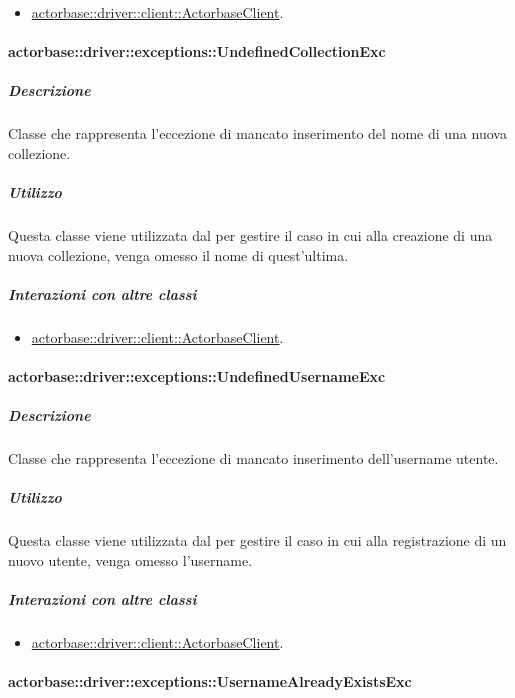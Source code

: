 \documentclass{scalatekids-article}
\begin{document}
\begin{itemize}
\item \hyperref[sec:actorbase::driver::client::ActorbaseClient]{actorbase::driver::client::ActorbaseClient}.
\end{itemize}

\paragraph{actorbase::driver::exceptions::UndefinedCollectionExc}

\subparagraph{Descrizione}

Classe che rappresenta l'eccezione di mancato inserimento del nome di una nuova collezione.

\subparagraph{Utilizzo}

Questa classe viene utilizzata dal  per gestire il caso in cui alla creazione di una nuova collezione, venga omesso il nome di quest'ultima.

\subparagraph{Interazioni con altre classi}

\begin{itemize}
\item \hyperref[sec:actorbase::driver::client::ActorbaseClient]{actorbase::driver::client::ActorbaseClient}.
\end{itemize}

\paragraph{actorbase::driver::exceptions::UndefinedUsernameExc}

\subparagraph{Descrizione}

Classe che rappresenta l'eccezione di mancato inserimento dell'username utente.

\subparagraph{Utilizzo}

Questa classe viene utilizzata dal  per gestire il caso in cui alla registrazione di un nuovo utente, venga omesso l'username.

\subparagraph{Interazioni con altre classi}

\begin{itemize}
	\item \hyperref[sec:actorbase::driver::client::ActorbaseClient]{actorbase::driver::client::ActorbaseClient}.
\end{itemize}

\paragraph{actorbase::driver::exceptions::UsernameAlreadyExistsExc}
\end{document}
